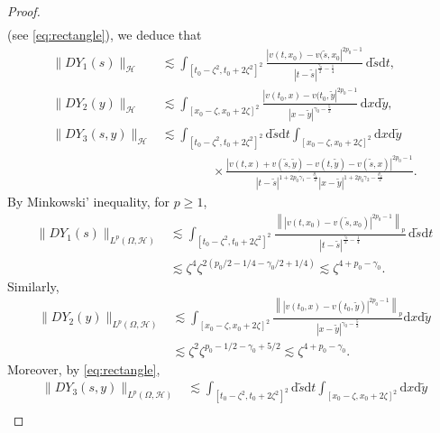 \documentclass[10pt,a4paper]{amsart}
\newcommand {\deltah}{{\zeta}}
\renewcommand{\d}{\mathrm{d}}
\begin{document}
\begin{proof}
\begin{align}
           \end{align}
           (see \eqref{eq:rectangle}),
we deduce that 
           \begin{align*}
           \|DY_1(s)\|_{\mathcal{H}} &\lesssim \int_{[t_0-\deltah^2, t_0+2\deltah^2]^2} \frac {|v(t,x_0)-v(\tilde{s},x_0|^{2p_0-1}
           }{|t-\tilde{s}|^{\frac{\gamma_0}{2}-\frac14}}\,  \d \tilde{s} \d t,\\
           \|DY_2(y)\|_{\mathcal{H}}&\lesssim \int_{[x_0-\deltah, x_0+2\deltah]^2} \frac {|v(t_0,x)-v(t_0,\tilde{y}|^{2p_0-1}}{|x-\tilde{y}|^{\gamma_0-\frac52} } \, \d x\d \tilde{y},\\
            \|DY_3(s,y)\|_{\mathcal{H}}&\lesssim \int_{[t_0-\deltah^2, t_0+2\deltah^2]^2}\d \tilde{s}\d t \int_{[x_0-\deltah, x_0+2\deltah]^2} \d x\d \tilde{y} 
            \\
            &\qquad\qquad \times \frac {|v(t,x)+v(\tilde{s},\tilde{y})-v(t,\tilde{y})-v(\tilde{s},x)|^{2p_0-1}
            }{|t-\tilde{s}|^{1+2p_0\gamma_1 -\frac{\theta_1}{2}}|x-\tilde{y}|^{1+2p_0\gamma_2-\frac{\theta_2}{2}}}.
           \end{align*}
           By Minkowski' inequality, for $p\geq 1$,
           \begin{align}\label{eq:Y1}
           \|DY_1(s)\|_{L^p(\Omega, \mathcal{H})} &\lesssim  \int_{[t_0-\deltah^2, t_0+2\deltah^2]^2} \frac {\left\||v(t,x_0)-v(\tilde{s},x_0)|^{2p_0-1}\right\|_{p}
           }{|t-\tilde{s}|^{\frac{\gamma_0}{2}-\frac14}}\, \d \tilde{s} \d t \nonumber\\
           &\lesssim \zeta^4 \zeta^{2(p_0/2 - 1/4 - \gamma_0/2 + 1/4)} \lesssim \deltah^{4+p_0-\gamma_0}.
           \end{align}
            Similarly, 
           \begin{align}\label{eq:Y2}
           \|DY_2(y)\|_{L^p(\Omega, \mathcal{H})} &\lesssim 
           \int_{[x_0-\deltah, x_0+2\deltah]^2} \frac {\left\||v(t_0,x)-v(t_0,\tilde{y})|^{2p_0-1}\right\|_{p}}{|x-\tilde{y}|^{\gamma_0-\frac52} }\d x\d \tilde{y}\nonumber\\
           &\lesssim \zeta^2 \zeta^{p_0 - 1/2 - \gamma_0 + 5/2} \lesssim \deltah^{4+p_0-\gamma_0}.
           \end{align}
Moreover, by \eqref{eq:rectangle}, 
           \begin{align}\label{eq:Y3}
                       \|DY_3(s,y)\|_{L^p(\Omega, \mathcal{H})}&\lesssim \int_{[t_0-\deltah^2, t_0+2\deltah^2]^2}\d \tilde{s}\d t \int_{[x_0-\deltah, x_0+2\deltah]^2} \d x\d \tilde{y} \\

\end{align}
\end{proof}
\end{document}
